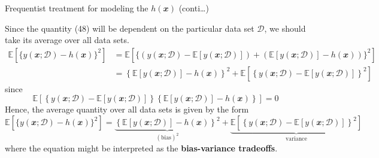 \documentclass{bredelebeamer}
\begin{document}
\begin{frame}{Frequentist treatment for modeling the $h(\mathbfit{x})$ (conti\ldots)}
  \begin{justify}
    Since the quantity (48) will be dependent on the particular data set $\mathcal{D}$,
    we should take its average over all data sets.
    \begin{equation}
      \begin{split}
        \mathbb{E}[{\{y(\mathbfit{x};\mathcal{D}) - h(\mathbfit{x})\}}^2]
        &= \mathbb{E}\left[{\{
            \left(y(\mathbfit{x};\mathcal{D}) - \mathbb{E}[y(\mathbfit{x};\mathcal{D})]\right)
          + \left(\mathbb{E}[y(\mathbfit{x};\mathcal{D})] - h(\mathbfit{x})\right)
          \}}^2\right] \\
        &= {\left\{\mathbb{E}[y(\mathbfit{x};\mathcal{D})] - h(\mathbfit{x})\right\}}^2
         + \mathbb{E}\left[
           {\left\{y(\mathbfit{x};\mathcal{D}) - \mathbb{E}[y(\mathbfit{x};\mathcal{D})]\right\}}^2
         \right]
      \end{split}
    \end{equation}
    since
    \begin{equation}
      \mathbb{E}[
      \left\{y(\mathbfit{x};\mathcal{D}) - \mathbb{E}[y(\mathbfit{x};\mathcal{D})]\right\}
      \left\{\mathbb{E}[y(\mathbfit{x};\mathcal{D})] - h(\mathbfit{x})\right\}
      ] = 0
    \end{equation}
    Hence, the average quantity over all data sets is given by the form
    \begin{equation}
      \mathbb{E}[{\{y(\mathbfit{x};\mathcal{D}) - h(\mathbfit{x})\}}^2]
      =
      \underbrace{
      {\left\{\mathbb{E}[y(\mathbfit{x};\mathcal{D})] - h(\mathbfit{x})\right\}}^2
      }_{(\textrm{bias})^2}
      +
      \underbrace{
      \mathbb{E}\left[
        {\left\{y(\mathbfit{x};\mathcal{D}) - \mathbb{E}[y(\mathbfit{x};\mathcal{D})]\right\}}^2
      \right]
      }_{\textrm{variance}}
    \end{equation}
    where the equation might be interpreted as the \textbf{bias-variance tradeoffs}.
  \end{justify}
\end{frame}
\end{document}
